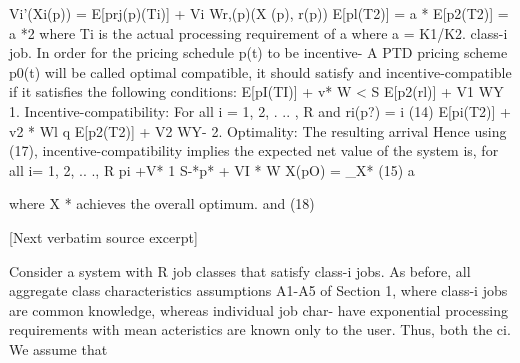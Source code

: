 \documentclass[10pt]{article}
\begin{document}
\begin{ReviewVerbatim}
Vi'(Xi(p)) = E[prj(p)(Ti)] + Vi Wr,(p)(X (p), r(p))
                                                                       E[pl(T2)] = a * E[p2(T2)] = a *2
where Ti is the actual processing requirement of a
                                                                      where a = K1/K2.
class-i job.
                                                                         In order for the pricing schedule p(t) to be incentive-
  A PTD pricing scheme p0(t) will be called optimal
                                                                       compatible, it should satisfy
and incentive-compatible if it satisfies the following
conditions:
                                                                       E[pI(TI)] + v* W < S E[p2(rl)] + V1 WY
   1. Incentive-compatibility: For all i = 1, 2, . .. , R
                                                                       and
   ri(p?)                   =        i      (14)
                                                                       E[pi(T2)] + v2 * Wl q E[p2(T2)] + V2 WY-
      2.       Optimality:                                       The                 resulting                         arrival
                                                                       Hence using (17), incentive-compatibility implies
  the expected                                          net                value                 of        the            system
is, for all i= 1, 2, .. ., R
                                                                       pi +V* 1 S-*p* + VI * W
  X(pO)                =     _X*                (15)                                         a



where X * achieves the overall optimum.                                      and                          (18)

[Next verbatim source excerpt]

                                                              Consider a system with R job classes that satisfy
class-i jobs. As before, all aggregate class characteristics
                                                            assumptions A1-A5 of Section 1, where class-i jobs
are common knowledge, whereas individual job char-
                                                            have exponential processing requirements with mean
acteristics are known only to the user. Thus, both the
                                                           ci. We assume that
\end{ReviewVerbatim}
\end{document}
